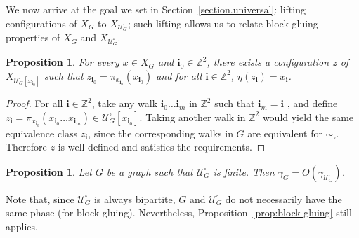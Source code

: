 \documentclass{article}
\newtheorem{proposition}[theorem]{Proposition}
\newcommand\quadcover[1]{\mathcal{U}^\square_{#1}}
\begin{document}
We now arrive at the goal we set in Section~\ref{section.universal}: lifting configurations of $X_G$ to $X_{\quadcover{G}}$; such lifting allows us to relate block-gluing properties of $X_G$ and $X_{\quadcover{G}}$. 

\begin{proposition}\label{prop.square.to.graph}
For every $x \in X_G$ and $\textbf{i}_0 \in \mathbb{Z}^2$, there exists a configuration $z$ of $X_{\quadcover{G}[x_{\boldsymbol{i}_0}]}$ such that $z_{\boldsymbol{i}_0} = \pi_{ x_{\boldsymbol{i}_0}}(x_{\boldsymbol{i}_0})$ and for all $\boldsymbol{i} \in \mathbb{Z}^2$, $\eta(z_{\boldsymbol{i}})=x_{\boldsymbol{i}}$.
\end{proposition}

\begin{proof}
For all $\textbf{i} \in \mathbb{Z}^2$, take any walk $\textbf{i}_0 \dots \textbf{i}_m$ in $\mathbb{Z}^2$ such that $\textbf{i}_m = \textbf{i}$ , and define $z_{\boldsymbol{i}} = \pi_{ x_{\boldsymbol{i}_0}}(x_{\textbf{i}_0}  \dots  x_{\textbf{i}_m})\in\quadcover{G}[ x_{\boldsymbol{i}_0}]$. Taking another walk in $\mathbb Z^2$ would yield the same equivalence class $z_{\boldsymbol{i}}$, since the corresponding walks in $G$ are equivalent for $\sim_\square$. Therefore $z$ is well-defined and satisfies the requirements.
\end{proof}

\begin{proposition}\label{proposition.square.to.gamma}
Let $G$ be a graph such that $\quadcover{G}$ is finite. Then $\gamma_{G} = O(\gamma_{\quadcover{G}})$.
\end{proposition}

Note that, since $\quadcover{G}$ is always bipartite, $G$ and $\quadcover{G}$ do not necessarily have the same phase (for block-gluing). Nevertheless, Proposition~\ref{prop:block-gluing} still applies.
\end{document}
